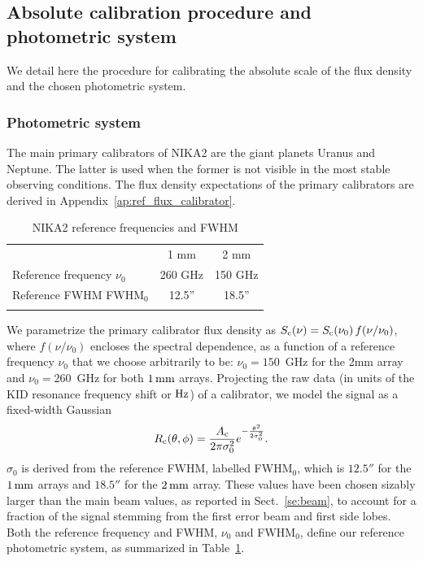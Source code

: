 \subsection{Absolute calibration procedure and photometric system}
\label{se:calibration_method}

We detail here the procedure for calibrating the absolute scale of
the flux density and the chosen photometric system.

\subsubsection{Photometric system}
\label{se:photometric_system}

The main primary calibrators of NIKA2 are the giant planets Uranus and
Neptune. The latter is used when the former is not visible in the most
stable observing conditions. The flux density expectations of the
primary calibrators are derived in Appendix~\ref{ap:ref_flux_calibrator}. 
%
\begin{table}[!htbp]
\caption{NIKA2 reference frequencies and FWHM}
\label{tab:definitions}
\centering     
\begin{tabular}{lcc}
\hline\hline
      \noalign{\smallskip}
      & 1 mm & 2 mm \\
      \noalign{\smallskip}
      \hline
      \noalign{\smallskip}
      Reference frequency $\nu_{0}$ & 260 GHz & 150 GHz \\
      Reference FWHM  FWHM$_{0}$    & 12.5'' & 18.5'' \\
      \noalign{\smallskip}
      \hline
\end{tabular}
\end{table}

We parametrize the primary calibrator flux density as 
$S_{\rm{c}}(\nu) = S_{\rm{c}}(\nu_0)\, f(\nu/\nu_{0})$, where $f(\nu/\nu_{0})$
encloses the spectral dependence, 
as a function of a reference frequency $\nu_{0}$ that we choose
arbitrarily to be: $\nu_{0} = 150$~GHz for the 2mm array and
$\nu_{0}= 260$~GHz for both $1\,\rm{mm}$ arrays. Projecting the raw
data (in units of the KID resonance frequency shift or $\rm Hz$) of a
calibrator, we model the signal as a fixed-width Gaussian
\begin{equation}
  R_{\rm{c}}(\theta, \phi)  = \frac{A_{\rm{c}}}{2 \pi \sigma_{0}^{2}}
  e^{-\frac{\theta^{2}}{2\sigma_{0}^{2}}}.
  \label{eq:gaussian_amplitude}
\end{equation}
$\sigma_{0}$ is derived from the
reference FWHM, labelled FWHM$_{0}$, which is $12.5''$ for the $1\, \rm{mm}$
arrays and $18.5''$ for the $2\,\rm{mm}$ array. These values have
been chosen sizably larger than the main beam values, as reported in
Sect.~\ref{se:beam}, to account for a fraction of the signal stemming from
the first error beam and first side lobes.
Both the reference frequency and FWHM, $\nu_0$ and FWHM$_{0}$, define
our reference photometric system, as summarized in Table~\ref{tab:definitions}.


